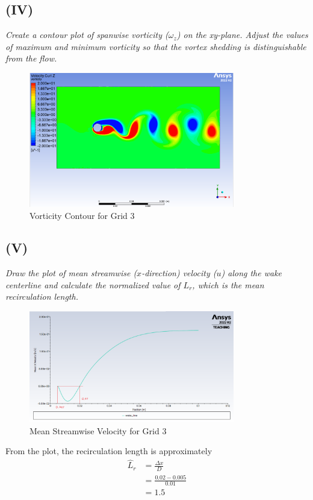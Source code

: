 \subsection{(IV)}
\textit{Create a contour plot of spanwise vorticity ($\omega_z$) on the xy-plane. Adjust the values of maximum and minimum vorticity so that the vortex shedding is distinguishable from the flow.}
\begin{figure}[H]
    \centering
    \includegraphics[width=0.8\textwidth]{Questions/Figures/vorticity contour grid 3.png}
    \caption{Vorticity Contour for Grid 3}
\end{figure}

\subsection{(V)}
\textit{Draw the plot of mean streamwise ($x$-direction) velocity ($u$) along the wake centerline and calculate the normalized value of $L_r$, which is the mean recirculation length.}

\begin{figure}[H]
    \centering
    \includegraphics[width=0.8\textwidth]{Questions/Figures/mean x velocity along wake center line grid 3.png}
    \caption{Mean Streamwise Velocity for Grid 3}
\end{figure}
From the plot, the recirculation length is approximately
\begin{align*}
    \hat{L}_r &= \frac{\Delta x}{D} \\
    &= \frac{0.02 - 0.005}{0.01} \\
    &= \boxed{1.5}
\end{align*}

